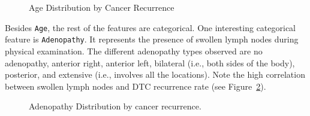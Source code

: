 \documentclass[
  letterpaper,
  DIV=11,
  numbers=noendperiod]{scrartcl}
\begin{document}
\label{cell-fig-age-dist-pdf}
\begin{figure}[H]


\caption{\label{fig-age-dist-pdf}Age Distribution by Cancer Recurrence}

\end{figure}%

Besides \texttt{Age}, the rest of the features are categorical. One
interesting categorical feature is \texttt{Adenopathy}. It represents
the presence of swollen lymph nodes during physical examination. The
different adenopathy types observed are no adenopathy, anterior right,
anterior left, bilateral (i.e., both sides of the body), posterior, and
extensive (i.e., involves all the locations). Note the high correlation
between swollen lymph nodes and DTC recurrence rate (see
Figure~\ref{fig-aden-dist-pdf}).

\label{cell-fig-aden-dist-pdf}
\begin{figure}[H]


\caption{\label{fig-aden-dist-pdf}Adenopathy Distribution by cancer
recurrence.}

\end{figure}%
\end{document}
